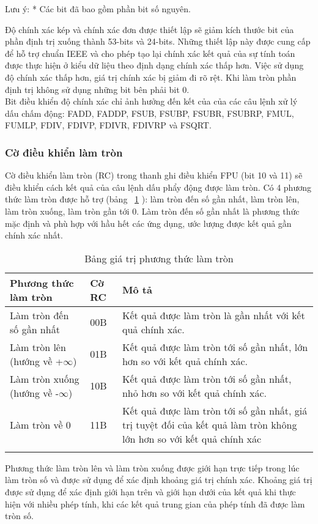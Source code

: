 	Lưu ý: * Các bit đã bao gồm phần bit số nguyên. 
		
	Độ chính xác kép và chính xác đơn được thiết lập sẽ giảm kích thước bit của phần định trị xuống thành 53-bits và 24-bits. Những thiết lập này được cung cấp để hỗ trợ chuẩn IEEE và cho phép tạo lại chính xác kết quả của sự tính toán được thực hiện ở kiểu dữ liệu theo định dạng chính xác thấp hơn. Việc sử dụng độ chính xác thấp hơn, giá trị chính xác bị giảm đi rõ rệt. Khi làm tròn phần định trị không sử dụng những bit bên phải bit 0. \\
	
	Bit điều khiển độ chính xác chỉ ảnh hưởng đến kết của của các câu lệnh xử lý dấu chấm động: FADD, FADDP, FSUB, FSUBP, FSUBR, FSUBRP, FMUL, FUMLP, FDIV, FDIVP, FDIVR, FDIVRP và FSQRT.

		\subsubsection*{Cờ điều khiển làm tròn}
		Cờ điều khiển làm tròn (RC) trong thanh ghi điều khiển FPU (bit 10 và 11) sẽ điều khiển cách kết quả của câu lệnh dấu phẩy động được làm tròn. Có 4 phương thức làm tròn được hỗ trợ (bảng ~\ref{tb:LamTron} ): làm tròn đến số gần nhất, làm tròn lên, làm tròn xuống, làm tròn gần tới 0. Làm tròn đến số gần nhất là phương thức mặc định và phù hợp với hầu hết các ứng dụng, ước lượng được kết quả gần chính xác nhất.
		\begin{longtable}{|m{6cm}|m{2cm}|m{6cm}|}
		\hline
			Phương thức làm tròn & Cờ RC & Mô tả\\
		\hline
		\hline
			Làm tròn đến số gần nhất & 00B & Kết quả được làm tròn là gần nhất với kết quả chính xác.\\
		\hline
			Làm tròn lên (hướng về +$\mathbf{\infty}$) &01B& Kết quả được làm tròn tới số gần nhất, lớn hơn so với kết quả chính xác. \\
		\hline
			Làm tròn xuống (hướng về -$\mathbf{\infty}$) & 10B &Kết quả được làm tròn tới số gần nhất,  nhỏ hơn so với kết quả chính xác. \\
		\hline
			Làm tròn về 0 & 11B & Kết quả được làm tròn tới số gần nhất,  giá trị tuyệt đối của kết quả làm tròn không lớn hơn so với kết quả chính xác\\
		\hline
			\caption{Bảng giá trị  phương thức làm tròn}
			\label{tb:LamTron}
		\end{longtable}
	
		Phương thức làm tròn lên và làm tròn xuống được giới hạn trực tiếp trong lúc làm tròn số và được sử dụng để xác định khoảng giá trị chính xác. Khoảng giá trị được sử dụng để xác định giới hạn trên và giới hạn dưới của kết quả khi thực hiện với nhiều phép tính, khi các kết quả trung gian của phép tính đã được làm tròn số.\\ 
		
